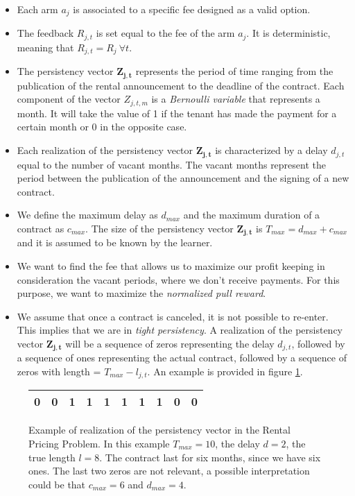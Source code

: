 \begin{itemize}
	\item Each arm $a_j$ is associated to a specific fee designed as a valid option.
	\item The feedback $R_{j,t}$ is set equal to the fee of the arm $a_j$. It is deterministic, meaning that $R_{j,t} = R_j \ \forall t$.  
	\item The persistency vector $\boldsymbol{Z_{j,t}}$ represents the period of time ranging from the publication of the rental announcement to the deadline of the contract. Each component of the vector $Z_{j,t,m}$ is a \emph{Bernoulli variable} that represents a month. It will take the value of 1 if the tenant has made the payment for a certain month or 0 in the opposite case.
	\item Each realization of the persistency vector $\boldsymbol{Z_{j,t}}$ is characterized by a delay $d_{j,t}$ equal to the number of vacant months. The vacant months represent the period between the publication of the announcement and the signing of a new contract.
	\item We define the maximum delay as $d_{max}$ and the maximum duration of a contract as $c_{max}$. The size of the persistency vector $\boldsymbol{Z_{j,t}}$ is $T_{max} = d_{max} + c_{max}$ and it is assumed to be known by the learner.
	\item We want to find the fee that allows us to maximize our profit keeping in consideration the vacant periods, where we don't receive payments. For this purpose, we want to maximize the \emph{normalized pull reward}.
	\item We assume that once a contract is canceled, it is not possible to re-enter. This implies that we are in \emph{tight persistency}. A realization of the persistency vector $\boldsymbol{Z_{j,t}}$ will be a sequence of zeros representing the delay $d_{j,t}$, followed by a sequence of ones representing the actual  contract, followed by a sequence of zeros with length = $T_{max}-l_{j,t}$. An example is provided in figure \ref{bucket_affitto}.
\end{itemize}
 	


\begin{figure}[h]
	\centering
	
	

		\begin{tabular}{|cccccccccc|}
			\hline
			0 & 0 & 1 & 1 & 1 & 1 & 1 & 1 & 0 & 0 \\ \hline
		\end{tabular}
	
	
	
	
	\caption{Example of realization of the persistency vector in the Rental Pricing Problem. In this example $T_{max}=10$, the delay $d=2$, the true length $l=8$. The contract last for six months, since we have six ones. The last two zeros are not relevant, a possible interpretation could be that $c_{max}=6$ and $d_{max}=4$.}
	\label{bucket_affitto}
\end{figure}



